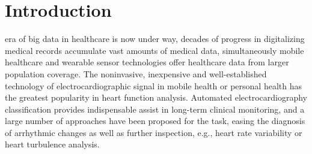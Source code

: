 \documentclass[journal]{IEEEtran}
\begin{document}
\section{Introduction}
% 
% 
% 
% 
 era of big data in healthcare is now under way, decades of progress in digitalizing medical records accumulate vast amounts of medical data, simultaneously mobile healthcare and wearable sensor technologies offer healthcare data from larger population coverage. The noninvasive, inexpensive and well-established technology of electrocardiographic signal in mobile health or personal health has the greatest popularity in heart function analysis. Automated electrocardiography classification provides indispensable assist in long-term clinical monitoring, and a large number of approaches have been proposed for the task, easing the diagnosis of arrhythmic changes as well as further inspection, e.g., heart rate variability or heart turbulence analysis.
\end{document}
